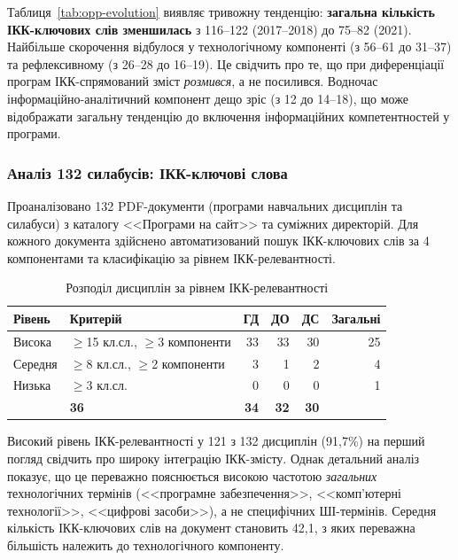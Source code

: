 Таблиця~\ref{tab:opp-evolution} виявляє тривожну тенденцію: \textbf{загальна кількість ІКК-ключових слів зменшилась} з 116--122 (2017--2018) до 75--82 (2021). Найбільше скорочення відбулося у технологічному компоненті (з 56--61 до 31--37) та рефлексивному (з 26--28 до 16--19). Це свідчить про те, що при диференціації програм ІКК-спрямований зміст \textit{розмився}, а не посилився. Водночас інформаційно-аналітичний компонент дещо зріс (з 12 до 14--18), що може відображати загальну тенденцію до включення інформаційних компетентностей у програми.

\subsubsection{Аналіз 132 силабусів: ІКК-ключові слова}\label{sssec:2.2.2}

Проаналізовано 132 PDF-документи (програми навчальних дисциплін та силабуси) з каталогу <<Програми на сайт>> та суміжних директорій. Для кожного документа здійснено автоматизований пошук ІКК-ключових слів за 4 компонентами та класифікацію за рівнем ІКК-релевантності.

\begin{table}[htbp]
\centering
\caption{Розподіл дисциплін за рівнем ІКК-релевантності}\label{tab:syllabus-relevance}
\small
\begin{tabularx}{\textwidth}{@{}Xlrrrr@{}}
\toprule
\textbf{Рівень} & \textbf{Критерій} & \textbf{ГД} & \textbf{ДО} & \textbf{ДС} & \textbf{Загальні} \\
\midrule
Висока & $\geq$15 кл.сл., $\geq$3 компоненти & 33 & 33 & 30 & 25 \\
Середня & $\geq$8 кл.сл., $\geq$2 компоненти & 3 & 1 & 2 & 4 \\
Низька & $\geq$3 кл.сл. & 0 & 0 & 0 & 1 \\
\addlinespace
\midrule
\multicolumn{2}{@{}l}{\textbf{Разом}} & \textbf{36} & \textbf{34} & \textbf{32} & \textbf{30} \\
\bottomrule
\end{tabularx}
\end{table}

Високий рівень ІКК-релевантності у 121 з 132 дисциплін (91,7\%) на перший погляд свідчить про широку інтеграцію ІКК-змісту. Однак детальний аналіз показує, що це переважно пояснюється високою частотою \textit{загальних} технологічних термінів (<<програмне забезпечення>>, <<комп'ютерні технології>>, <<цифрові засоби>>), а не специфічних ШІ-термінів. Середня кількість ІКК-ключових слів на документ становить 42,1, з яких переважна більшість належить до технологічного компоненту.


